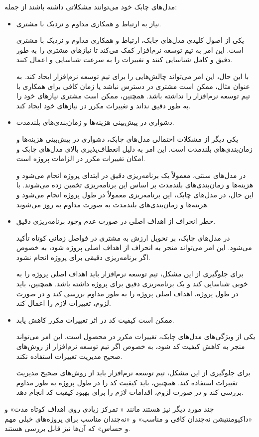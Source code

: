 مدل‌های چابک خود می‌توانند مشکلاتی داشته باشند از جمله:
\begin{itemize}
	\item نیاز به ارتباط و همکاری مداوم و نزدیک با مشتری.
	
	یکی از اصول کلیدی مدل‌های چابک، ارتباط و همکاری مداوم و نزدیک با مشتری است. این امر به تیم توسعه نرم‌افزار کمک می‌کند تا نیازهای مشتری را به طور دقیق و کامل شناسایی کنند و تغییرات را به سرعت شناسایی و اعمال کنند.
	
	با این حال، این امر می‌تواند چالش‌هایی را برای تیم توسعه نرم‌افزار ایجاد کند. به عنوان مثال، ممکن است مشتری در دسترس نباشد یا زمان کافی برای همکاری با تیم توسعه نرم‌افزار را نداشته باشد. همچنین، ممکن است مشتری نیازهای خود را به طور دقیق نداند و تغییرات مکرر در نیازهای خود ایجاد کند.
	
	\item دشواری در پیش‌بینی هزینه‌ها و زمان‌بندی‌های بلندمدت.
	
	یکی دیگر از مشکلات احتمالی مدل‌های چابک، دشواری در پیش‌بینی هزینه‌ها و زمان‌بندی‌های بلندمدت است. این امر به دلیل انعطاف‌پذیری بالای مدل‌های چابک و امکان تغییرات مکرر در الزامات پروژه است.
	
	در مدل‌های سنتی، معمولاً یک برنامه‌ریزی دقیق در ابتدای پروژه انجام می‌شود و هزینه‌ها و زمان‌بندی‌های بلندمدت بر اساس این برنامه‌ریزی تخمین زده می‌شوند. با این حال، در مدل‌های چابک، این برنامه‌ریزی معمولاً در طول پروژه انجام می‌شود و هزینه‌ها و زمان‌بندی‌های بلندمدت به صورت مداوم به روز می‌شوند.
	
	\item خطر انحراف از اهداف اصلی در صورت عدم وجود برنامه‌ریزی دقیق.
	
	در مدل‌های چابک، بر تحویل ارزش به مشتری در فواصل زمانی کوتاه تأکید می‌شود. این امر می‌تواند منجر به انحراف از اهداف اصلی پروژه شود، به خصوص اگر برنامه‌ریزی دقیقی برای پروژه انجام نشود.
	
	برای جلوگیری از این مشکل، تیم توسعه نرم‌افزار باید اهداف اصلی پروژه را به خوبی شناسایی کند و یک برنامه‌ریزی دقیق برای پروژه داشته باشد. همچنین، باید در طول پروژه، اهداف اصلی پروژه را به طور مداوم بررسی کند و در صورت لزوم، تغییرات لازم را اعمال کند.
	
	\item ممکن است کیفیت کد در اثر تغییرات مکرر کاهش یابد.
	
	یکی از ویژگی‌های مدل‌های چابک، تغییرات مکرر در محصول است. این امر می‌تواند منجر به کاهش کیفیت کد شود، به خصوص اگر تیم توسعه نرم‌افزار از روش‌های صحیح مدیریت تغییرات استفاده نکند.
	
	برای جلوگیری از این مشکل، تیم توسعه نرم‌افزار باید از روش‌های صحیح مدیریت تغییرات استفاده کند. همچنین، باید کیفیت کد را در طول پروژه به طور مداوم بررسی کند و در صورت لزوم، اقدامات لازم را برای بهبود کیفیت کد انجام دهد.
	
\end{itemize}

چند مورد دیگر نیز هستند مانند « تمرکز زیادی روی اهداف کوتاه مدت» و «داکیومنتیشن نه‌چندان کافی و مناسب» و «نه‌چندان مناسب برای پروژه‌های خیلی مهم و حساس» که آن‌ها نیز قابل بررسی هستند.

